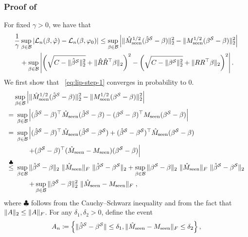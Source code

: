 \subsubsection{Proof of }
For fixed $\gamma > 0$, we have that
\begin{align}
    \frac{1}{\gamma} & \sup_{\beta \in \mathcal{B}}|\mathcal{L}_n(\beta, \hat\varphi) - \mathcal{L}_n(\beta, \varphi_0)|
    \leq
    \sup_{\beta \in \mathcal{B}}\left|
    \|\hat{M}_{\mathrm{seen}}^{1/2}(\hat\beta^{\mathcal{S}} - \beta)\|_2^2
    - \|M_{\mathrm{seen}}^{1/2}(\beta^{\mathcal{S}} - \beta)\|_2^2
    \right| \label{eq:lip-step-1}
    \\
    & + 
    \sup_{\beta \in \mathcal{B}}\left |\left(\sqrt{C - \|\hat{\beta}^{\mathcal{S}}\|_2^2}  + \|\hat{R}\hat{R}^\top \beta\|_2\right)^2 
    - \left(\sqrt{C - \|\beta^{\mathcal{S}}\|_2^2}  + \|RR^\top \beta\|_2\right)^2\right|.
    \label{eq:lip-step-2}
\end{align}
We first show that ~\eqref{eq:lip-step-1} converges in probability to 0. 
\begin{align}
    &\sup_{\beta \in \cB}\left|
    \norm{\PSM^{1/2}(\hat{\beta}^{\cS} - \beta)}_2^2
    - \norm{\PSMpop^{1/2}(\betastarS - \beta)}_2^2
    \right| \notag\\
    = &\ 
    \sup_{\beta \in \cB}
    \left|(\hat{\beta}^{\cS} - \beta)^\top \PSM(\hat{\beta}^{\cS} - \beta) 
    - (\betastarS - \beta)^\top \PSMpop (\betastarS - \beta) \right| \notag\\
    = &\
    \sup_{\beta \in \cB}\left|(\hat{\beta}^{\cS} - \beta)^\top \PSM (\hat{\beta}^{\cS} - \betastarS)
    + (\hat{\beta}^{\cS} - \betastarS)^\top \PSM(\betastarS - \beta) \right. \notag \\
    & \left. \quad\quad + (\betastarS - \beta)^\top (\PSM - \PSMpop) (\betastarS - \beta) \right| \notag\\
    \stackrel{\clubsuit}{\leq}&\ 
     \sup_{\beta \in \cB} \norm{\hat{\beta}^{\cS} - \beta}_2\ \norm{\PSM}_F\ \norm{\hat{\beta}^{\cS} - \betastarS}_2
     + \sup_{\beta \in \cB} \norm{\betastarS - \beta}_2\ \norm{\PSM}_F\ \norm{\hat{\beta}^{\cS} - \betastarS}_2 \notag \\
     & \left. \quad\quad +
     \sup_{\beta \in \cB} \norm{\betastarS - \beta}_2^2\ \norm{\PSM - \PSMpop}_F\right. \label{eq:bound-1-1},
\end{align}
where $\clubsuit$ follows from the Cauchy--Schwarz inequality and from the fact that $\|A\|_2 \leq \|A\|_F$.
For any $\delta_1, \delta_2 > 0$, define the event
\begin{align*}
    A_n \coloneqq \left\{\|\hat{\beta}^{\mathcal{S}} - \beta^{\mathcal{S}}\| \leq \delta_1, \|\hat{M}_{\mathrm{seen}} - M_{\mathrm{seen}}\|_F \leq \delta_2\right\},
\end{align*}
